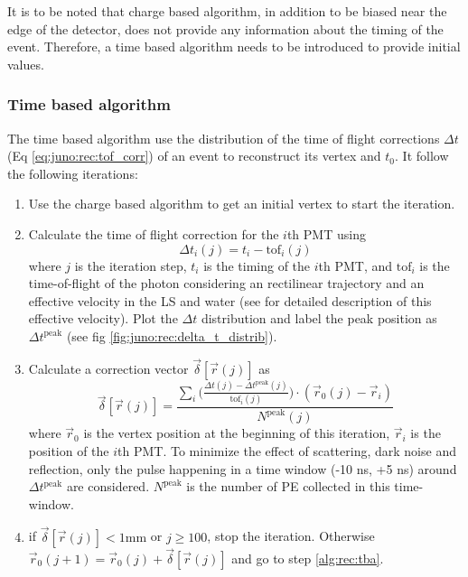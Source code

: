 It is to be noted that charge based algorithm, in addition to be biased near the edge of the detector, does not provide any information about the timing of the event. Therefore, a time based algorithm needs to be introduced to provide initial values.

\subsubsection{Time based algorithm}

The time based algorithm use the distribution of the time of flight corrections $\Delta t$ (Eq \ref{eq:juno:rec:tof_corr}) of an event to reconstruct its vertex and $t_0$. It follow the following iterations:

\begin{enumerate}
  \item Use the charge based algorithm to get an initial vertex to start the iteration.

  \item \label{alg:rec:tba} Calculate the time of flight correction for the $i$th PMT using \begin{equation}
      \label{eq:juno:rec:tof_corr}
      \Delta t_i (j) = t_i - \mathrm{tof}_i (j)
    \end{equation}
    where $j$ is the iteration step, $t_i$ is the timing of the $i$th PMT, and $\mathrm{tof}_i$ is the time-of-flight of the photon considering an rectilinear trajectory and an effective velocity in the LS and water (see \cite{li_event_2021} for detailed description of this effective velocity). Plot the $\Delta t$ distribution and label the peak position as $\Delta t^{\mathrm{peak}}$ (see fig \ref{fig:juno:rec:delta_t_distrib}).

  \item Calculate a correction vector $\vec{\delta} [\vec{r}(j)]$ as \begin{equation}
      \vec{\delta} [\vec{r}(j)] = \frac{\sum_i \bigg(\frac{\Delta t(j) - \Delta t^{\mathrm{peak}}(j)}{\mathrm{tof}_i(j)} \bigg) \cdot (\vec{r}_0(j) - \vec{r}_i)}{N^{\mathrm{peak}}(j)}
    \end{equation}
    where $\vec{r}_0$ is the vertex position at the beginning of this iteration, $\vec{r}_i$ is the position of the $i$th PMT. To minimize the effect of scattering, dark noise and reflection, only the pulse happening in a time window (-10 ns, +5 ns) around $\Delta t^{\mathrm{peak}}$ are considered. $N^{\mathrm{peak}}$ is the number of PE collected in this time-window.

  \item if $\vec{\delta} [\vec{r}(j)] < 1 \mathrm{mm}$ or $j \geq 100$, stop the iteration. Otherwise $\vec{r}_0 (j + 1) = \vec{r}_0 (j) + \vec{\delta} [\vec{r}(j)]$ and go to step \ref{alg:rec:tba}.
\end{enumerate}


